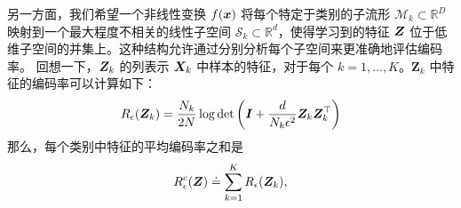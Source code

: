 \documentclass[../../book-main_zh.tex]{subfiles}
\begin{document}
另一方面，我们希望一个非线性变换 $f(\bm{x})$ 将每个特定于类别的子流形 $\mathcal{M}_k \subset \mathbb{R}^D$ 映射到一个最大程度不相关的线性子空间 $\mathcal{S}_k \subset \mathbb{R}^d$，使得学习到的特征 $\bm{Z}$ 位于低维子空间的并集上。这种结构允许通过分别分析每个子空间来更准确地评估编码率。%
回想一下，$\bm{Z}_k$ 的列表示 $\bm{X}_k$ 中样本的特征，对于每个 $k=1,\dots,K$。$\bm Z_k$ 中特征的编码率可以计算如下：
\begin{align}
    R_{\epsilon}(\bm{Z}_k) = \frac{N_k}{2N}\log\det\left(\bm{I} + \frac{d}{N_k\epsilon^{2}}\bm{Z}_k\bm{Z}_k^{\top}\right)
\end{align}
那么，每个类别中特征的平均编码率之和是
\begin{equation}
	 R_{\epsilon}^c(\bm{Z}) \doteq \sum_{k=1}^K R_{\epsilon}(\bm{Z}_k),
	\label{chap4-eqn:compress-loss-eval}
\end{equation}
\end{document}
